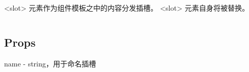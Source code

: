 <slot> 元素作为组件模板之中的内容分发插槽。 <slot> 元素自身将被替换。



\begin{lstlisting}[language=JavaScript]

\end{lstlisting}

\subsection{Props}


\begin{compactitem}
\item name - string，用于命名插槽
\end{compactitem}




\begin{lstlisting}[language=JavaScript]

\end{lstlisting}




\begin{lstlisting}[language=JavaScript]

\end{lstlisting}






